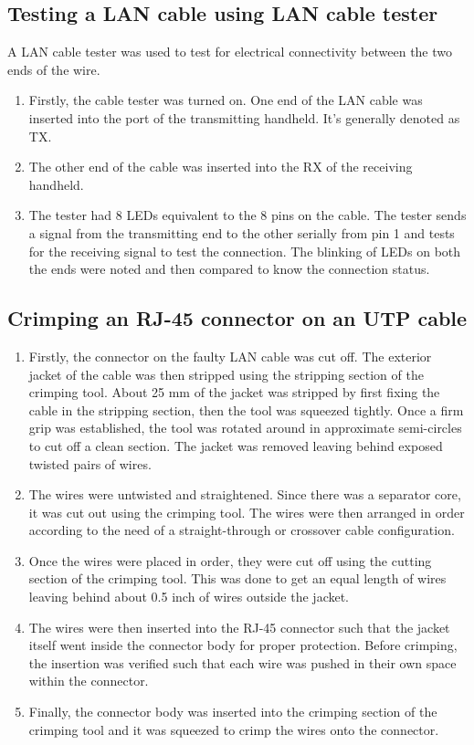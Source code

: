 \documentclass{lab_sheet}
\begin{document}
\subsection{Testing a LAN cable using LAN cable tester}
A LAN cable tester was used to test for electrical connectivity between the two ends of the wire.
\begin{enumerate}
    \item Firstly, the cable tester was turned on. One end of the LAN cable was inserted into the port of the transmitting handheld. It's generally denoted as TX.
    \item The other end of the cable was inserted into the RX of the receiving handheld.
    \item The tester had 8 LEDs equivalent to the 8 pins on the cable. The tester sends a signal from the transmitting end to the other serially from pin 1 and tests for the receiving signal to test the connection. The blinking of LEDs on both the ends were noted and then compared to know the connection status.
\end{enumerate}
\subsection{Crimping an RJ-45 connector on an UTP cable}
\begin{enumerate}
    \item Firstly, the connector on the faulty LAN cable was cut off. The exterior jacket of the cable was then stripped using the stripping section of the crimping tool. About 25 mm of the jacket was stripped by first fixing the cable in the stripping section, then the tool was squeezed tightly. Once a firm grip was established, the tool was rotated around in approximate semi-circles to cut off a clean section. The jacket was removed leaving behind exposed twisted pairs of wires.
    \item The wires were untwisted and straightened. Since there was a separator core, it was cut out using the crimping tool. The wires were then arranged in order according to the need of a straight-through or crossover cable configuration.
    \item Once the wires were placed in order, they were cut off using the cutting section of the crimping tool. This was done to get an equal length of wires leaving behind about 0.5 inch of wires outside the jacket.
    \item The wires were then inserted into the RJ-45 connector such that the jacket itself went inside the connector body for proper protection. Before crimping, the insertion was verified such that each wire was pushed in their own space within the connector.
    \item Finally, the connector body was inserted into the crimping section of the crimping tool and it was squeezed to crimp the wires onto the connector.
\end{enumerate}
\end{document}

